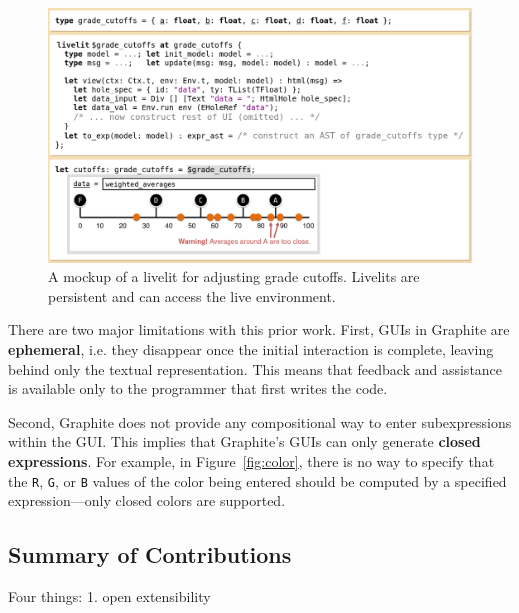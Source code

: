 \begin{figure}[t!]
\begin{center}
\includegraphics[width=34pc]{cutoffs-mockup.png}\end{center}
\caption{A mockup of a livelit for adjusting grade cutoffs. Livelits are persistent and can access the live environment.}
\label{fig:cutoffs}
\end{figure}

There are two major limitations with this prior work. 
First, GUIs in Graphite are \textbf{ephemeral}, i.e. they disappear once the initial interaction is complete, leaving behind only the textual representation. This means that feedback and assistance is available only to the programmer
that first writes the code. 

Second, Graphite does not provide any compositional way to {enter subexpressions within the GUI}.
This implies that Graphite's GUIs can only generate \textbf{closed expressions}. For example, in Figure~\ref{fig:color}, there is no way to specify that the \texttt{R}, \texttt{G}, or \texttt{B} values of the color being entered should be computed by a specified expression---only closed colors are supported. 


\subsection{Summary of Contributions}
Four things:
1. open extensibility

